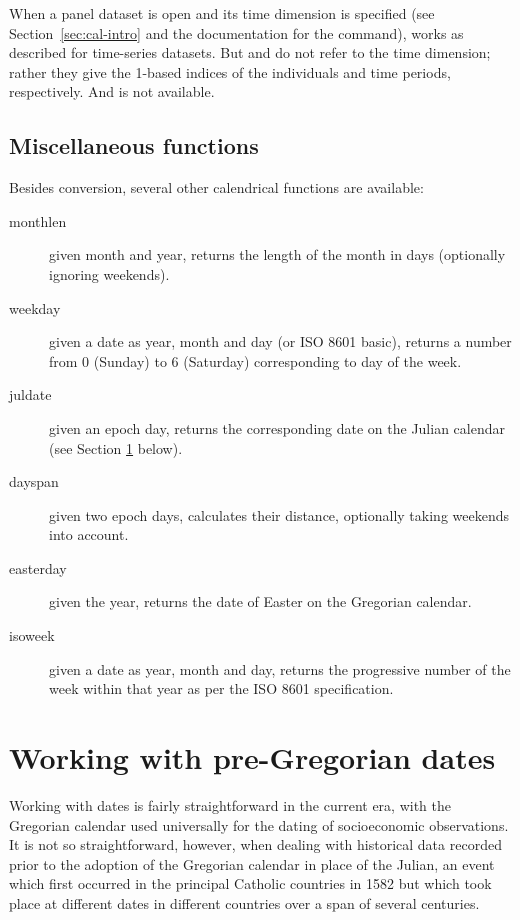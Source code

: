 When a panel dataset is open and its time dimension is specified (see
Section~\ref{sec:cal-intro} and the documentation for the 
command),  works as described for time-series
datasets. But  and  do not refer to
the time dimension; rather they give the 1-based indices of the
individuals and time periods, respectively. And  is
not available.


\subsection{Miscellaneous functions}
\label{sec:cal-misc}

Besides conversion, several other calendrical functions are available:
\begin{description}
\item[monthlen] given month and year, returns the length of the month
  in days (optionally ignoring weekends).
\item[weekday] given a date as year, month and day (or ISO 8601
  basic), returns a number from 0 (Sunday) to 6 (Saturday)
  corresponding to day of the week.
\item[juldate] given an epoch day, returns the corresponding date on
  the Julian calendar (see Section \ref{sec:cal-conversion} below).
\item[dayspan] given two epoch days, calculates their distance,
  optionally taking weekends into account.
\item[easterday] given the year, returns the date of Easter on the
  Gregorian calendar.
\item[isoweek] given a date as year, month and day, returns the
  progressive number of the week within that year as per the ISO 8601
  specification.
\end{description}


\section{Working with pre-Gregorian dates}
\label{sec:cal-conversion}

Working with dates is fairly straightforward in the current era, with
the Gregorian calendar used universally for the dating of
socioeconomic observations. It is not so straightforward, however,
when dealing with historical data recorded prior to the adoption of
the Gregorian calendar in place of the Julian, an event which first
occurred in the principal Catholic countries in 1582 but which took
place at different dates in different countries over a span of several
centuries.

